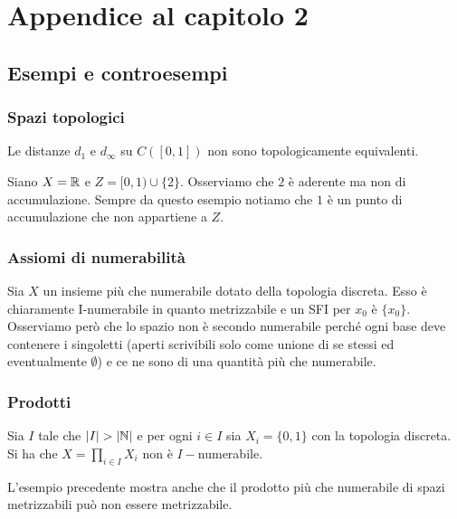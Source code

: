 \section{Appendice al capitolo 2}

\begin{multicols*}{2}

\subsection{Esempi e controesempi}

\subsubsection{Spazi topologici}
\begin{example}\label{DistanzeNonTopEquivalenti}
Le distanze $d_1$ e $d_\infty$ su $C([0,1])$ non sono topologicamente equivalenti.
\end{example}


\begin{example}\label{AderenteNonAccumulazione}
Siano $X=\mathbb{R}$ e $Z=[0,1)\cup \{2\}$. Osserviamo che $2$ \`e aderente ma non di accumulazione. Sempre da questo esempio notiamo che $1$ \`e un punto di accumulazione che non appartiene a $Z$.
\end{example}

\subsubsection{Assiomi di numerabilit\`a}
\begin{example}\label{INumerabileNonIINumerabile}
Sia $X$ un insieme  pi\`u che numerabile dotato della topologia discreta. Esso \`e chiaramente I-numerabile in quanto metrizzabile e un SFI per $x_0$ \`e $\{x_0\}$. Osserviamo per\`o che lo spazio non \`e secondo numerabile perch\'e ogni base deve contenere i singoletti (aperti scrivibili solo come unione di se stessi ed eventualmente $\emptyset$) e ce ne sono di una quantit\`a pi\`u che numerabile.
\end{example}

\subsubsection{Prodotti}
\begin{example}\label{ProdottoDiINumerabileNonINumerabile}
Sia $I$ tale che $|I|>|\N|$ e per ogni $i\in I$ sia $X_i=\{0,1\}$ con la topologia discreta. Si ha che $X=\prod_{i\in I}X_i$ non \`e $I-$numerabile.
\end{example}
\begin{remark}
L'esempio precedente mostra anche che il prodotto pi\`u che numerabile di spazi metrizzabili pu\`o non essere metrizzabile.
\end{remark}



\end{multicols*}
